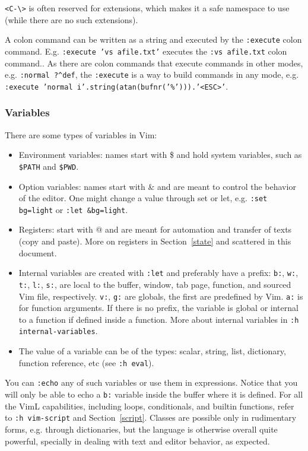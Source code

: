 \documentclass{article}
\newcommand{\ttt}[1] {
	\texttt{<#1>}}
\newcommand{\tttt}[1]{\texttt{#1}}
\begin{document}
\ttt{C-\textbackslash} is often reserved for extensions,
which makes it a safe namespace to use (while there are no
such extensions).

A colon command can be written as a string
and executed by the \tttt{:execute} colon command.
E.g. \tttt{:execute 'vs afile.txt'} executes the \tttt{:vs afile.txt}
colon command..
As there are colon commands that execute commands in other
modes, e.g. \tttt{:normal ?\textasciicircum def},
the \tttt{:execute} is a way to build commands in any mode,
e.g. \tttt{:execute 'normal i'.string(atan(bufnr('\%'))).'<ESC>'}.


\subsubsection{Variables}
There are some types of variables in Vim:
\begin{itemize}
	\item Environment variables: names start with \$ and hold system
		variables, such as \tttt{\$PATH} and \tttt{\$PWD}.
	\item Option variables: names start with \& and are meant to control the behavior of the editor.
		One might change a value through set or let, e.g.
		\tttt{:set bg=light} or \tttt{:let \&bg=light}.
	\item Registers: start with @ and are meant for automation and transfer of texts (copy and paste).
    More on registers in Section~\ref{state} and scattered in this
    document.
  \item Internal variables are created with \tttt{:let} and preferably have a prefix:
	\tttt{b:}, \tttt{w:}, \tttt{t:}, \tttt{l:}, \tttt{s:},
		are local to the buffer, window, tab page, function, and
		sourced Vim file, respectively.
 \tttt{v:}, \tttt{g:} are globals, the first are predefined by Vim.
		\tttt{a:} is for function arguments.
		If there is no prefix, the variable is global or internal to a function if defined inside a function.
		More about internal variables in \tttt{:h internal-variables}.
	\item The value of a variable can be of the types: scalar, string, list, dictionary, function reference, etc (see \tttt{:h eval}).
\end{itemize}
You can \tttt{:echo} any of such variables or use them in expressions.
Notice that you will only be able to echo a \tttt{b:} variable inside
the buffer where it is defined.
For all the VimL capabilities, including loops, conditionals,
and builtin functions, refer to \tttt{:h vim-script} and Section~\ref{script}.
Classes are possible only in rudimentary forms, e.g. through dictionaries,
but the language is otherwise overall quite powerful,
specially in dealing with text and editor behavior, as expected.
\end{document}
